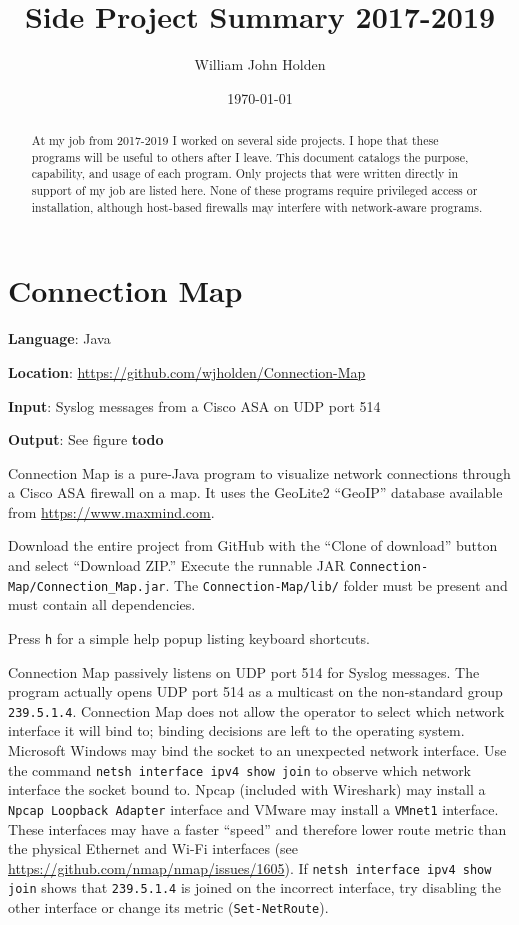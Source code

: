\documentclass[12pt]{article}
\title{Side Project Summary 2017-2019}
\author{William John Holden}
\date{\today}
\begin{document}
\maketitle

\begin{abstract}
At my job from 2017-2019 I worked on several side projects.
I hope that these programs will be useful to others after I leave.
This document catalogs the purpose, capability, and usage of each program.
Only projects that were written directly in support of my job are listed here.
None of these programs require privileged access or installation, although host-based firewalls may interfere with network-aware programs.
\end{abstract}

\section{Connection Map}

\textbf{Language}: Java

\textbf{Location}: \url{https://github.com/wjholden/Connection-Map}

\textbf{Input}: Syslog messages from a Cisco ASA on UDP port 514

\textbf{Output}: See figure \textbf{todo}

Connection Map is a pure-Java program to visualize network connections through a Cisco ASA firewall on a map. It uses the GeoLite2 ``GeoIP'' database available from \url{https://www.maxmind.com}.

Download the entire project from GitHub with the ``Clone of download'' button and select ``Download ZIP.'' Execute the runnable JAR \texttt{Connection-Map/Connection\_Map.jar}. The \texttt{Connection-Map/lib/} folder must be present and must contain all dependencies.

Press \texttt{h} for a simple help popup listing keyboard shortcuts.

Connection Map passively listens on UDP port 514 for Syslog messages. The program actually opens UDP port 514 as a multicast on the non-standard group \texttt{239.5.1.4}. Connection Map does not allow the operator to select which network interface it will bind to; binding decisions are left to the operating system. Microsoft Windows may bind the socket to an unexpected network interface. Use the command \texttt{netsh interface ipv4 show join} to observe which network interface the socket bound to. Npcap (included with Wireshark) may install a \texttt{Npcap Loopback Adapter} interface and VMware may install a \texttt{VMnet1} interface. These interfaces may have a faster ``speed'' and therefore lower route metric than the physical Ethernet and Wi-Fi interfaces (see \url{https://github.com/nmap/nmap/issues/1605}). If \texttt{netsh interface ipv4 show join} shows that \texttt{239.5.1.4} is joined on the incorrect interface, try disabling the other interface or change its metric (\texttt{Set-NetRoute}).
\end{document}
